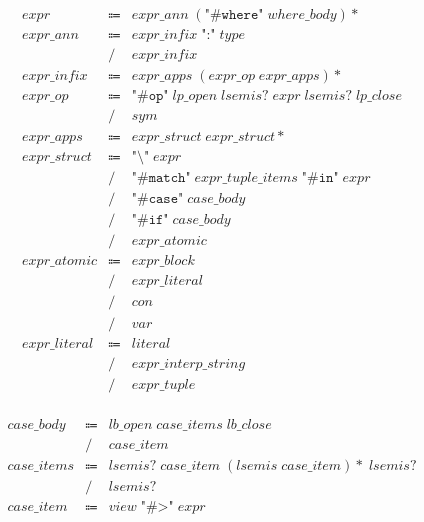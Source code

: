 \begin{align*}
    \begin{array}{rcll}
        \mathit{expr}
        &\Coloneq &\mathit{expr\_ann}\; (\texttt{"\#where"}\; \mathit{where\_body}){*} \\
        \mathit{expr\_ann}
        &\Coloneq &\mathit{expr\_infix}\; \texttt{":"}\; \mathit{type} \\
        &\mathrel{/} &\mathit{expr\_infix} \\
        \mathit{expr\_infix}
        &\Coloneq &\mathit{expr\_apps}\; (\mathit{expr\_op}\; \mathit{expr\_apps}){*} \\
        \mathit{expr\_op}
        &\Coloneq &\texttt{"\#op"}\; \mathit{lp\_open}\; \mathit{lsemis}{?}\; \mathit{expr}\; \mathit{lsemis}{?}\; \mathit{lp\_close} \\
        &\mathrel{/} &\mathit{sym} \\
        \mathit{expr\_apps}
        &\Coloneq &\mathit{expr\_struct}\; \mathit{expr\_struct}{*} \\
        \mathit{expr\_struct}
        &\Coloneq &\texttt{"\textbackslash"}\; \mathit{expr} \\
        &\mathrel{/} &\texttt{"\#match"}\; \mathit{expr\_tuple\_items}\; \texttt{"\#in"}\; \mathit{expr} \\
        &\mathrel{/} &\texttt{"\#case"}\; \mathit{case\_body} \\
        &\mathrel{/} &\texttt{"\#if"}\; \mathit{case\_body} \\
        &\mathrel{/} &\mathit{expr\_atomic} \\
        \mathit{expr\_atomic}
        &\Coloneq &\mathit{expr\_block} \\
        &\mathrel{/} &\mathit{expr\_literal} \\
        &\mathrel{/} &\mathit{con} \\
        &\mathrel{/} &\mathit{var} \\
        \mathit{expr\_literal}
        &\Coloneq &\mathit{literal} \\
        &\mathrel{/} &\mathit{expr\_interp\_string} \\
        &\mathrel{/} &\mathit{expr\_tuple}
    \end{array}
\end{align*}

\begin{align*}
    \begin{array}{rcll}
        \mathit{case\_body}
        &\Coloneq &\mathit{lb\_open}\; \mathit{case\_items}\; \mathit{lb\_close} \\
        &\mathrel{/} &\mathit{case\_item} \\
        \mathit{case\_items}
        &\Coloneq &\mathit{lsemis}{?}\; \mathit{case\_item}\; (\mathit{lsemis}\; \mathit{case\_item}){*}\; \mathit{lsemis}{?} \\
        &\mathrel{/} &\mathit{lsemis}{?} \\
        \mathit{case\_item}
        &\Coloneq &\mathit{view}\; \texttt{"\#>"}\; \mathit{expr}
    \end{array}
\end{align*}

